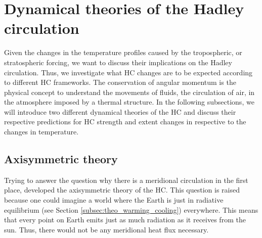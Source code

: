 \section{Dynamical theories of the Hadley circulation}
Given the changes in the temperature profiles caused by the tropospheric, or stratospheric \CO{} forcing, we want to discuss their implications on the Hadley circulation. Thus, we investigate what HC changes are to be expected according to different HC frameworks. The conservation of angular momentum is the physical concept to understand the movements of fluids, the circulation of air, in the atmosphere imposed by a thermal structure. In the following subsections, we will introduce two different dynamical theories of the HC and discuss their respective predictions for HC strength and extent changes in respective to the changes in temperature.

\subsection{Axisymmetric theory}\label{sec:axisymmetric}
Trying to answer the question why there is a meridional circulation in the first place, \textcite{heldNonlinearAxiallySymmetric1980} developed the axisymmetric theory of the HC. This question is raised because one could imagine a world where the Earth is just in radiative equilibrium (see Section \ref{subsec:theo_warming_cooling}) everywhere. This means that every point on Earth emits just as much radiation as it receives from the sun. Thus, there would not be any meridional heat flux necessary. 

